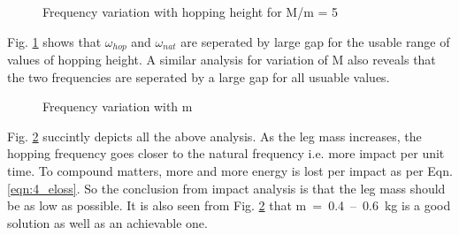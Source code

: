 \begin{figure}[!h]
\centering
\caption{Frequency variation with hopping height for M/m = 5}
\label{fig:4_freq_height}
\end{figure}
Fig. \ref{fig:4_freq_height} shows that $\omega_{hop}$ and $\omega_{nat}$ are seperated by large gap for the usable range
of values of hopping height. A similar analysis for variation of M also reveals that the two frequencies are seperated
by a large gap for all usuable values.
\begin{figure}[!h]
\centering
\caption{Frequency variation with m}
\label{fig:4_freq_m}
\end{figure}
Fig. \ref{fig:4_freq_m} succintly depicts all the above analysis. As the leg mass increases, the hopping frequency goes
closer to the natural frequency i.e. more impact per unit time. To compound matters, more and more energy is lost per impact
as per Eqn. \ref{eqn:4_eloss}. So the conclusion from impact analysis is that the leg mass should be as low as possible. It is also
seen from Fig. \ref{fig:4_freq_m} that \mbox{m = 0.4 -- 0.6 kg} is a good solution as well as an achievable one. 



